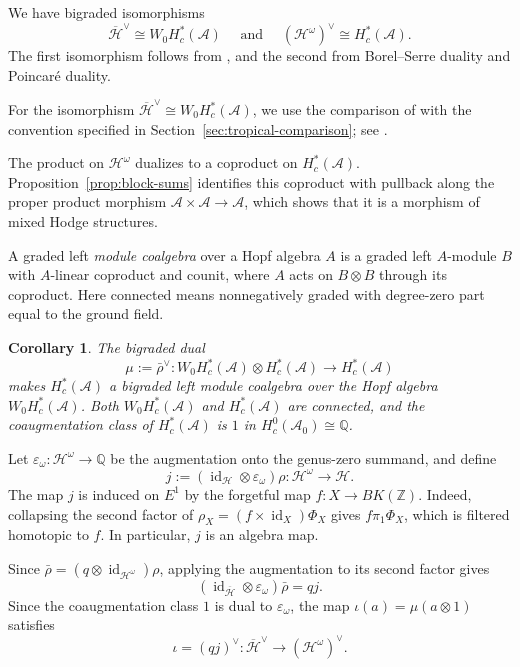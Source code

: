 \documentclass[12 pt]{amsart}
\newcommand{\QQ}{\mathbb{Q}}
\newcommand{\ZZ}{\mathbb{Z}}
\newcommand{\cA}{\mathcal{A}}
\newcommand{\cH}{\mathcal{H}}
\newcommand{\<}{\langle}
\renewcommand{\>}{\rangle}
\newtheorem{corollary}[theorem]{Corollary}
\theoremstyle{definition}
\newcommand{\id}{\operatorname{id}}
\begin{document}
We have bigraded isomorphisms
\[
\overline{\cH}^{\vee} \cong W_0 H^*_c(\cA) \quad \mbox{ and } \quad (\cH^\omega)^\vee \cong H^*_c(\cA).
\]
The first isomorphism follows from \cite{BCGP}, and the second from Borel--Serre duality \cite[Theorems~11.4.2 and~11.4.4]{BorelSerre} and Poincar\'e duality.

For the isomorphism $\overline{\cH}^{\vee} \cong W_0 H_c^*(\cA)$, we use the comparison of \cite[\S2.4]{BCGP} with the convention specified in Section~\ref{sec:tropical-comparison}; see \cite[Remark~2.21]{BCGP}.

The product on $\cH^\omega$ dualizes to a coproduct on $H_c^*(\cA)$. Proposition~\ref{prop:block-sums} identifies this coproduct with pullback along the proper product morphism $\cA \times \cA \to \cA$, which shows that it is a morphism of mixed Hodge structures.

\medskip

A graded left \emph{module coalgebra} over a Hopf algebra $A$ is a graded left $A$-module $B$ with $A$-linear coproduct and counit, where $A$ acts on $B \otimes B$ through its coproduct. Here connected means nonnegatively graded with degree-zero part equal to the ground field.

\begin{corollary}\label{cor:module-coalgebra}
The bigraded dual
\[
\mu := \bar \rho^\vee \colon W_0 H^*_c(\cA) \otimes H^*_c(\cA) \longrightarrow H^*_c(\cA)
\]
makes $H^*_c(\cA)$ a bigraded left module coalgebra over the Hopf algebra $W_0 H^*_c(\cA)$. Both $W_0 H^*_c(\cA)$ and $H^*_c(\cA)$ are connected, and the coaugmentation class of $H^*_c(\cA)$ is $1$ in $H_c^0(\cA_0) \cong \QQ$.
\end{corollary}


Let $\varepsilon_\omega \colon \cH^\omega \to \QQ$ be the augmentation onto the genus-zero summand, and define
\[
j := (\id_{\cH} \otimes \varepsilon_\omega) \rho \colon \cH^\omega \longrightarrow \cH.
\]
The map $j$ is induced on $E^1$ by the forgetful map $f \colon X \to BK(\ZZ)$. Indeed, collapsing the second factor of $\rho_X = (f \times \id_X) \Phi_X$ gives $f \pi_1 \Phi_X$, which is filtered homotopic to $f$. In particular, $j$ is an algebra map.

Since $\bar \rho = (q \otimes \id_{\cH^\omega}) \rho$, applying the augmentation to its second factor gives
\[
(\id_{\overline{\cH}} \otimes \varepsilon_\omega) \bar \rho = qj.
\]
Since the coaugmentation class $1$ is dual to $\varepsilon_\omega$, the map $\iota(a) = \mu(a \otimes 1)$ satisfies
\[
\iota = (qj)^\vee \colon \overline{\cH}^{\vee} \longrightarrow (\cH^\omega)^\vee.
\]
\end{document}
